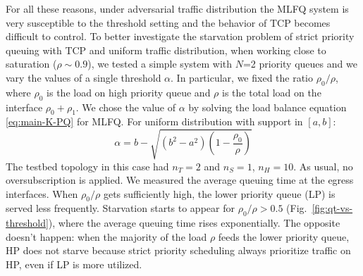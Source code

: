 For all these reasons, under adversarial traffic distribution the MLFQ system is very susceptible to the threshold setting and the behavior of TCP becomes difficult to control.
To better investigate the starvation problem of strict priority queuing with TCP and uniform traffic distribution, when working close to saturation ($\rho \sim 0.9$), we tested a simple system with $N$=2 priority queues and we vary the values of a single threshold $\alpha$. 
In particular, we fixed the ratio $\rho_{0} / \rho$, where $\rho_0$ is the load on high priority queue and $\rho$ is the total load on the interface $\rho_{0} + \rho_{1}$. We chose the value of $\alpha$ by solving the load balance equation \eqref{eq:main-K-PQ} for MLFQ. For uniform distribution with support in $[a,b]$:
\begin{equation*}
\alpha = b - \sqrt{(b^2 - a^2)(1-\dfrac{\rho_{0}}{  \rho})}
\end{equation*}
The testbed topology in this case had $n_T=2$ and $n_S=1$, $n_H=10$. As usual, no oversubscription is applied. We measured the average queuing time at the egress interfaces. %
When $\rho_{0} / \rho$ gets sufficiently high, the lower priority queue (LP) is served less frequently.  Starvation starts to appear for $\rho_0 / \rho > 0.5$ (Fig.~\ref{fig:qt-vs-threshold}), where the average queuing time rises exponentially. The opposite doesn't happen: when the majority of the load $\rho$ feeds the lower priority queue, HP does not starve because strict priority scheduling always prioritize traffic on HP, even if LP is more utilized. 
